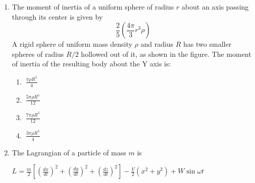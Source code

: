 \documentclass[journal]{IEEEtran}
\begin{document}
\begin{enumerate}
\item The moment of inertia of a uniform sphere of radius \( r \) about an axis passing through its center is given by
\[
\frac{2}{5} \left( \frac{4\pi}{3} r^3 \rho \right)
\]
A rigid sphere of uniform mass density \( \rho \) and radius \( R \) has two smaller spheres of radius \( R/2 \) hollowed out of it, as shown in the figure. The moment of inertia of the resulting body about the Y axis is:
\begin{center}
\end{center}
\begin{enumerate}
\item $ \ \frac{\pi \rho R^5}{4}
\quad $
\item $ \ \frac{5\pi \rho R^5}{12}
\quad $
\item $ \ \frac{7\pi \rho R^5}{12}
\quad $
\item $ \ \frac{3\pi \rho R^5}{4}
$
\end{enumerate}
\newpage
\item The Lagrangian of a particle of mass \( m \) is

$L = \frac{m}{2} \left[ \left( \frac{dx}{dt} \right)^2 + \left( \frac{dy}{dt} \right)^2 + \left( \frac{dz}{dt} \right)^2 \right] - \frac{V}{2} \left( x^2 + y^2 \right) + W \sin \omega t $


\end{enumerate}
\end{document}
